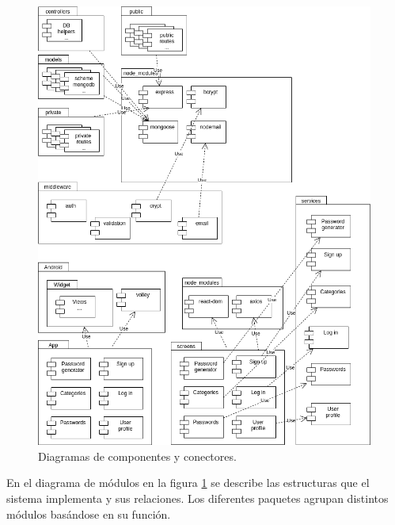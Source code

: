 \documentclass{article}
\begin{document}
\begin{figure}[H]
   \centering
       \includegraphics[width=0.99\textwidth]{../images/modulos_v1.png}
   \caption{Diagramas de componentes y conectores.}
   \label{modulos}
\end{figure}
\pagebreak

En el diagrama de módulos en la figura \ref{modulos} se describe las estructuras que el sistema implementa y sus relaciones. Los diferentes paquetes agrupan distintos módulos basándose en su función.
\end{document}
